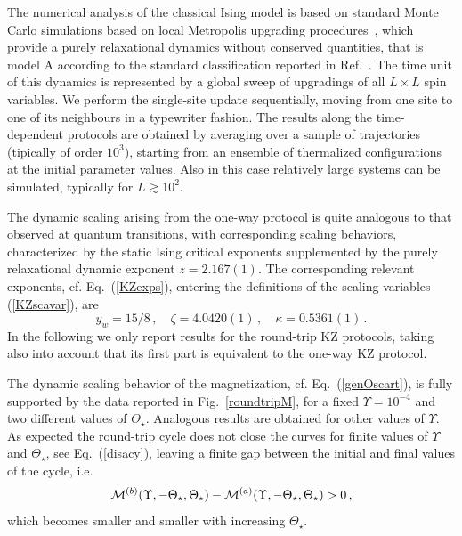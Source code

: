The numerical analysis of the classical Ising model is based on
standard Monte Carlo simulations based on local Metropolis upgrading
procedures~\cite{Metropolis:1953am}, which provide a purely
relaxational dynamics without conserved quantities, that is model A
according to the standard classification reported in
Ref.~\cite{HH-77}.  The time unit of this dynamics is represented by a
global sweep of upgradings of all $L\times L$ spin variables. We
perform the single-site update sequentially, moving from one site to
one of its neighbours in a typewriter fashion.  The results along the
time-dependent protocols are obtained by averaging over a sample of
trajectories (tipically of order $10^3$), starting from an ensemble of
thermalized configurations at the initial parameter values. Also in
this case relatively large systems can be simulated, typically for
$L\gtrsim 10^2$.



The dynamic scaling arising from the one-way protocol is quite
analogous to that observed at quantum transitions, with corresponding
scaling behaviors, characterized by the static Ising critical exponents
supplemented by the purely relaxational dynamic exponent $z = 2.167(1)$.
The corresponding relevant exponents, cf. Eq.~(\ref{KZexps}), entering
the definitions of the scaling variables (\ref{KZscavar}), are
\begin{equation}
  y_w = 15/8\,,\quad \zeta = 4.0420(1)\,,\quad
  \kappa = 0.5361(1)\,.
  \label{clisiexps}
  \end{equation}
In the following we only report results for the round-trip KZ protocols,
taking also into account that its first part is equivalent to the
one-way KZ protocol.

The dynamic scaling behavior of the magnetization,
cf. Eq.~(\ref{genOscart}), is fully supported by the data reported in
Fig.~\ref{roundtripM}, for a fixed $\Upsilon=10^{-4}$ and two
different values of $\Theta_\star$.  Analogous results are obtained
for other values of $\Upsilon$.  As expected the round-trip cycle does
not close the curves for finite values of $\Upsilon$ and
$\Theta_\star$, see Eq.~(\ref{disacy}), leaving a finite gap between
the initial and final values of the cycle, i.e.
\begin{equation}
  {\cal M}^{(b)}(\Upsilon,-\Theta_{\star},\Theta_\star) -
  {\cal M}^{(a)}(\Upsilon,-\Theta_{\star},\Theta_\star)>0\,,
  \label{disacy2}
\end{equation}
which becomes smaller and smaller with increasing $\Theta_\star$.

